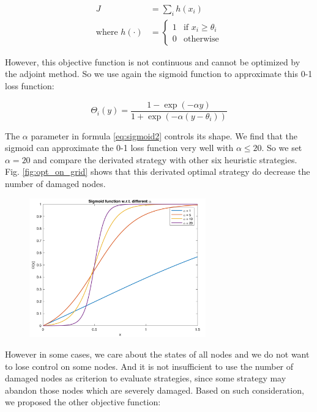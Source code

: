 \begin{equation}
	\label{eq:0_1_loss}
	\begin{aligned}
		J &= \sum_i h(x_i) \\
		\text{where } h(\cdot) &= 
		\begin{cases}
			1 & \text{if } x_i \ge \theta_i \\
			0 & \text{otherwise}
		\end{cases}
	\end{aligned}
\end{equation}

However, this objective function is not continuous and cannot be optimized by the adjoint method. So we use again the sigmoid function to approximate this 0-1 loss function:

\begin{equation}	
	\label{eq:sigmoid2}
	\Theta_i(y) = \frac{1-\exp(-\alpha y)}{1+\exp(-\alpha (y-\theta_i))}
\end{equation}

The $\alpha$ parameter in formula \ref{eq:sigmoid2} controls its shape. We find that the sigmoid can approximate the 0-1 loss function very well with $\alpha \leq 20$. So we set $\alpha=20$ and compare the derivated strategy with other six heuristic strategies. Fig. \ref{fig:opt_on_grid} shows that this derivated optimal strategy do decrease the number of damaged nodes.

\begin{figure}
	\label{eq:sigmoid_alpba}
	\centering
	\includegraphics[height=60mm]{../figs/sigmoid_small.pdf}
\end{figure}

However in some cases, we care about the states of all nodes and we do not want to lose control on some nodes. And it is not insufficient to use the number of damaged nodes as criterion to evaluate strategies, since some strategy may abandon those nodes which are severely damaged. Based on such consideration, we proposed the other objective function:

